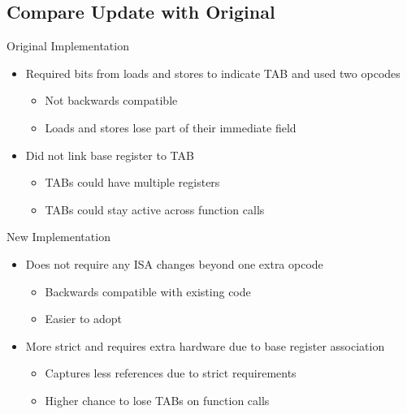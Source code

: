 \documentclass{beamer}
\begin{document}
\subsection{Compare Update with Original}
\begin{frame}{Original Implementation}
      \begin{itemize}
         \item Required bits from loads and stores to indicate TAB and used two opcodes
            \begin{itemize}
               \item Not backwards compatible
               \item Loads and stores lose part of their immediate field
            \end{itemize}
         \item Did not link base register to TAB
            \begin{itemize}
               \item TABs could have multiple registers
               \item TABs could stay active across function calls
            \end{itemize}
      \end{itemize}
   \end{frame}
      \begin{frame}{New Implementation}
      \begin{itemize}
         \item Does not require any ISA changes beyond one extra opcode
            \begin{itemize}
               \item Backwards compatible with existing code
               \item Easier to adopt
            \end{itemize}
         \item More strict and requires extra hardware due to base register association
            \begin{itemize}
               \item Captures less references due to strict requirements
               \item Higher chance to lose TABs on function calls
            \end{itemize}
      \end{itemize}
\end{frame}
\end{document}
